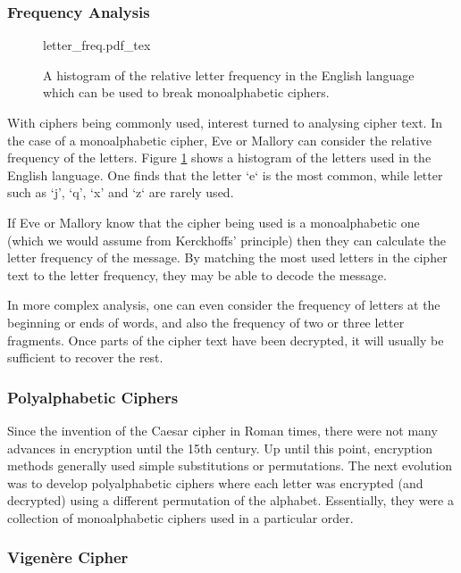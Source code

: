 \subsubsection*{Frequency Analysis}

\begin{figure}[t]
	\centering
	\def\svgwidth{0.6\textwidth}
   	{letter_freq.pdf_tex}
   	\caption[Relative letter frequency in the English language]{A histogram of the relative letter frequency in the English language which can be used to break monoalphabetic ciphers.}
   	\label{fig:letter_freq}
\end{figure}

With ciphers being commonly used, interest turned to analysing cipher text. In the case of a monoalphabetic cipher, Eve or Mallory can consider the relative frequency of the letters. Figure \ref{fig:letter_freq} shows a histogram of the letters used in the English language. One finds that the letter `e`  is the most common, while letter such as `j', `q', `x' and `z` are rarely used.

If Eve or Mallory know that the cipher being used is a monoalphabetic one (which we would assume from Kerckhoffs' principle) then they can calculate the letter frequency of the message. By matching the most used letters in the cipher text to the letter frequency, they may be able to decode the message. 

In more complex analysis, one can even consider the frequency of letters at the beginning or ends of words, and also the frequency of two or three letter fragments. Once parts of the cipher text have been decrypted, it will usually be sufficient to recover the rest.

\subsubsection{Polyalphabetic Ciphers}

Since the invention of the Caesar cipher in Roman times, there were not many advances in encryption until the 15th century. Up until this point, encryption methods generally used simple substitutions or permutations. The next evolution was to develop polyalphabetic ciphers where each letter was encrypted (and decrypted) using a different permutation of the alphabet. Essentially, they were a collection of monoalphabetic ciphers used in a particular order.

\subsubsection*{Vigen\`{e}re Cipher}

